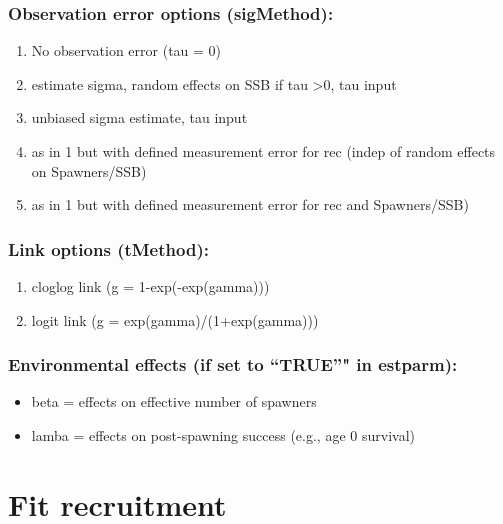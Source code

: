 \documentclass[]{article}
\providecommand{\tightlist}{%
  \setlength{\itemsep}{0pt}\setlength{\parskip}{0pt}}
\begin{document}
\subsubsection{Observation error options
(sigMethod):}\label{observation-error-options-sigmethod}

\begin{enumerate}
\def\labelenumi{\arabic{enumi}.}
\setcounter{enumi}{-1}
\tightlist
\item
  No observation error (tau = 0)
\item
  estimate sigma, random effects on SSB if tau \textgreater{}0, tau
  input
\item
  unbiased sigma estimate, tau input
\item
  as in 1 but with defined measurement error for rec (indep of random
  effects on Spawners/SSB)
\item
  as in 1 but with defined measurement error for rec and Spawners/SSB)
\end{enumerate}

\subsubsection{Link options (tMethod):}\label{link-options-tmethod}

\begin{enumerate}
\def\labelenumi{\arabic{enumi}.}
\tightlist
\item
  cloglog link (g = 1-exp(-exp(gamma)))
\item
  logit link (g = exp(gamma)/(1+exp(gamma)))
\end{enumerate}

\subsubsection{\texorpdfstring{Environmental effects (if set to
``TRUE''" in
estparm):}{Environmental effects (if set to TRUE" in estparm):}}\label{environmental-effects-if-set-to-true-in-estparm}

\begin{itemize}
\tightlist
\item
  beta = effects on effective number of spawners
\item
  lamba = effects on post-spawning success (e.g., age 0 survival)
\end{itemize}

\section{Fit recruitment}\label{fit-recruitment}
\end{document}
